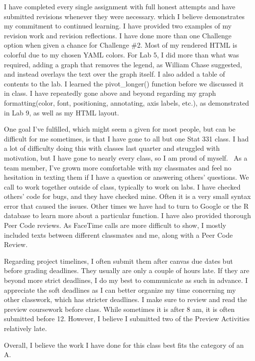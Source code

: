 \documentclass[
  letterpaper,
  DIV=11,
  numbers=noendperiod]{scrartcl}
\begin{document}
I have completed every single assignment with full honest attempts and
have submitted revisions whenever they were necessary. which I believe
demonstrates my commitment to continued learning. I have provided two
examples of my revision work and revision reflections. I have done more
than one Challenge option when given a chance for Challenge \#2. Most of
my rendered HTML is colorful due to my chosen YAML colors. For Lab 5, I
did more than what was required, adding a graph that removes the legend,
as William Chase suggested, and instead overlays the text over the graph
itself. I also added a table of contents to the lab. I learned the
pivot\_longer() function before we discussed it in class. I have
repeatedly gone above and beyond regarding my graph formatting(color,
font, positioning, annotating, axis labels, etc.), as demonstrated in
Lab 9, as well as my HTML layout.~

One goal I've fulfilled, which might seem a given for most people, but
can be difficult for me sometimes, is that I have gone to all but one
Stat 331 class. I had a lot of difficulty doing this with classes last
quarter and struggled with motivation, but I have gone to nearly every
class, so I am proud of myself.~ As a team member, I've grown more
comfortable with my classmates and feel no hesitation in texting them if
I have a question or answering others' questions. We call to work
together outside of class, typically to work on labs. I have checked
others' code for bugs, and they have checked mine. Often it is a very
small syntax error that caused the issues. Other times we have had to
turn to Google or the R database to learn more about a particular
function. I have also provided thorough Peer Code reviews. As FaceTime
calls are more difficult to show, I mostly included texts between
different classmates and me, along with a Peer Code Review.

Regarding project timelines, I often submit them after canvas due dates
but before grading deadlines. They usually are only a couple of hours
late. If they are beyond more strict deadlines, I do my best to
communicate as such in advance. I appreciate the soft deadlines as I can
better organize my time concerning my other classwork, which has
stricter deadlines. I make sure to review and read the preview
coursework before class. While sometimes it is after 8 am, it is often
submitted before 12. However, I believe I submitted two of the Preview
Activities relatively late.~

Overall, I believe the work I have done for this class best fits the
category of an A.~
\end{document}
